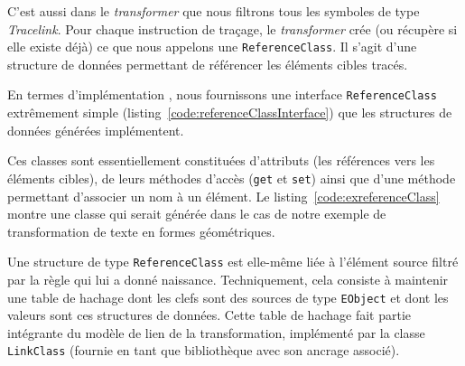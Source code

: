 \begin{figure}[h]
  \begin{center}
    
  \end{center}
\end{figure}

C'est aussi dans le \emph{transformer} que nous filtrons tous les symboles de
type \emph{Tracelink}. Pour chaque instruction de traçage, le
\emph{transformer} crée (ou récupère si elle existe déjà) ce que nous appelons
une \texttt{ReferenceClass}. Il s'agit d'une structure de données permettant de
référencer les éléments cibles tracés. 

En termes d'implémentation {\java}, nous fournissons une interface
\texttt{ReferenceClass} extrêmement simple
(listing~\ref{code:referenceClassInterface}) que les structures de données
générées implémentent.

\begin{figure}[h]
  \begin{center}
    
  \end{center}
\end{figure}

Ces classes sont essentiellement constituées d'attributs (les références vers
les éléments cibles), de leurs méthodes d'accès (\texttt{get} et \texttt{set})
ainsi que d'une méthode permettant d'associer un nom à un élément. Le
listing~\ref{code:exreferenceClass} montre une classe qui serait générée
dans le cas de notre exemple de transformation de texte en formes géométriques.

\begin{figure}[h]
  \begin{center}
    
  \end{center}
\end{figure}

Une structure de type \texttt{ReferenceClass} est elle-même liée à l'élément
source filtré par la règle qui lui a donné naissance. Techniquement, cela
consiste à maintenir une table de hachage dont les clefs sont des sources de
type \texttt{EObject} et dont les valeurs sont ces structures de données. Cette
table de hachage fait partie intégrante du modèle de lien de la transformation,
implémenté par la classe \texttt{LinkClass} (fournie en tant que bibliothèque
avec son ancrage associé).

